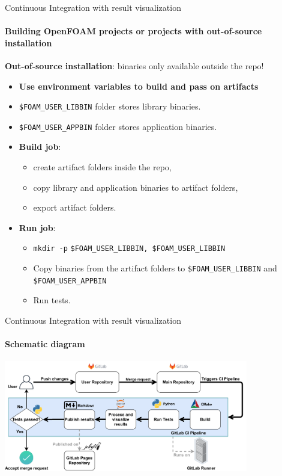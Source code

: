\documentclass[
	aspectratio=169,%
	color={accentcolor=2d},
	logo=true,%
	colorframetitle=true,%
	]{tudabeamer}
\begin{document}
\begin{frame}[fragile]{Continuous Integration with result visualization} 
    \framesubtitle{Building OpenFOAM projects or projects with out-of-source installation}

    \vfill
    \textbf{Out-of-source installation}: binaries only available outside the repo! 
    \begin{itemize}
        \item \textbf{Use environment variables to build and pass on artifacts} 
        \item \texttt{\$FOAM\_USER\_LIBBIN} folder stores library binaries. 
        \item \texttt{\$FOAM\_USER\_APPBIN} folder stores application binaries. 
        \item \textbf{Build job}: 
            \begin{itemize}
                \item create artifact folders inside the repo, 
                \item copy library and application binaries to artifact folders, 
                \item export artifact folders. 
            \end{itemize}
        \item \textbf{Run job}: 
            \begin{itemize} 
                \item \texttt{mkdir -p} \texttt{{\$FOAM\_USER\_LIBBIN, \$FOAM\_USER\_LIBBIN}}
                \item Copy binaries from the artifact folders to \texttt{\$FOAM\_USER\_LIBBIN} and  \texttt{\$FOAM\_USER\_APPBIN} 
                \item Run tests.
            \end{itemize}
    \end{itemize}


\end{frame}

\begin{frame}{Continuous Integration with result visualization} 
	\framesubtitle{Schematic diagram}

	\centering
	\includegraphics[width=0.8\textwidth]{figures/ZINF-CI-diagram.pdf}

\end{frame}
\end{document}
